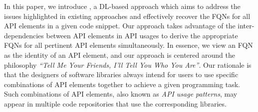 
In this paper, we introduce {\tool}, a DL-based approach which aims to address the issues highlighted in existing approaches and effectively recover the FQNs for all API elements in a given code snippet. Our approach takes advantage of the inter-dependencies between API elements in API usages to derive the appropriate FQNs for all pertinent API elements simultaneously. In essence, we view an FQN as the identity of an API element, and our approach is centered around the philosophy {\em ``Tell Me Your Friends, I'll Tell You Who You Are''}.
Our rationale is that the designers of software libraries always intend for users to use specific combinations of API elements together to achieve a given programming task. Such combinations of API elements, also known as {\em API usage patterns}, may appear in multiple code repositories that use the corresponding libraries.

